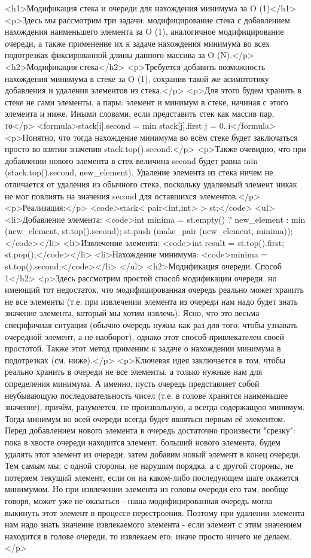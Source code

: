 <h1>Модификация стека и очереди для нахождения минимума за O (1)</h1>
<p>Здесь мы рассмотрим три задачи: модифицирование стека с добавлением нахождения наименьшего элемента за O (1), аналогичное модифицирование очереди, а также применение их к задаче нахождения минимума во всех подотрезках фиксированной длины данного массива за O (N).</p>
<h2>Модификация стека</h2>
<p>Требуется добавить возможность нахождения минимума в стеке за O (1), сохранив такой же асимптотику добавления и удаления элементов из стека.</p>
<p>Для этого будем хранить в стеке не сами элементы, а пары: элемент и минимум в стеке, начиная с этого элемента и ниже. Иными словами, если представить стек как массив пар, то</p>
<formula>stack[i].second = min { stack[j].first }
                 j = 0..i</formula>
<p>Понятно, что тогда нахождение минимума во всём стеке будет заключаться просто во взятии значения stack.top().second.</p>
<p>Также очевидно, что при добавлении нового элемента в стек величина second будет равна min (stack.top().second, new_element). Удаление элемента из стека ничем не отличается от удаления из обычного стека, поскольку удаляемый элемент никак не мог повлиять на значения second для оставшихся элементов.</p>
<p>Реализация:</p>
<code>stack< pair<int,int> > st;</code>
<ul>
<li>Добавление элемента:
<code>int minima = st.empty() ? new_element : min (new_element, st.top().second);
st.push (make_pair (new_element, minima));</code></li>
<li>Извлечение элемента:
<code>int result = st.top().first;
st.pop();</code></li>
<li>Нахождение минимума:
<code>minima = st.top().second;</code></li>
</ul>
<h2>Модификация очереди. Способ 1</h2>
<p>Здесь рассмотрим простой способ модификации очереди, но имеющий тот недостаток, что модифицированная очередь реально может хранить не все элементы (т.е. при извлечении элемента из очереди нам надо будет знать значение элемента, который мы хотим извлечь). Ясно, что это весьма специфичная ситуация (обычно очередь нужна как раз для того, чтобы узнавать очередной элемент, а не наоборот), однако этот способ привлекателен своей простотой. Также этот метод применим к задаче о нахождении минимума в подотрезках (см. ниже).</p>
<p>Ключевая идея заключается в том, чтобы реально хранить в очереди не все элементы, а только нужные нам для определения минимума. А именно, пусть очередь представляет собой неубывающую последовательность чисел (т.е. в голове хранится наименьшее значение), причём, разумеется, не произвольную, а всегда содержащую минимум. Тогда минимум во всей очереди всегда будет являться первым её элементом. Перед добавлением нового элемента в очередь достаточно произвести "срезку": пока в хвосте очереди находится элемент, больший нового элемента, будем удалять этот элемент из очереди; затем добавим новый элемент в конец очереди. Тем самым мы, с одной стороны, не нарушим порядка, а с другой стороны, не потеряем текущий элемент, если он на каком-либо последующем шаге окажется минимумом. Но при извлечении элемента из головы очереди его там, вообще говоря, может уже не оказаться - наша модифицированная очередь могла выкинуть этот элемент в процессе перестроения. Поэтому при удалении элемента нам надо знать значение извлекаемого элемента - если элемент с этим значением находится в голове очереди, то извлекаем его; иначе просто ничего не делаем.</p>
